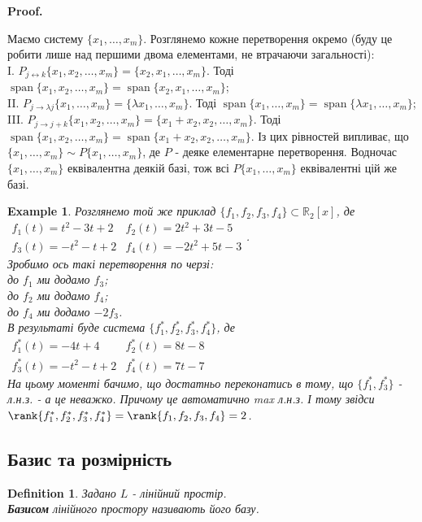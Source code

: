 \documentclass[a4paper, 10pt]{article}
\makeatletter
\theoremstyle{theoremdd}
\newtheorem{definition}[theorem]{Definition}
\newtheorem{example}[theorem]{Example}
\DeclareMathOperator{\linspan}{span}
\renewenvironment{proof}[1][Proof.\\]{\par
\pushQED{\hfill \qed}%
\normalfont \topsep6\p@\@plus6\p@\relax
\trivlist
\item\relax
{\bfseries
#1\@addpunct{.}}\hspace\labelsep\ignorespaces
}{%
\popQED\endtrivlist\@endpefalse
}
\makeatother
\begin{document}
	\begin{proof}
	Маємо систему $\{x_1,\dots,x_m\}$. Розглянемо кожне перетворення окремо (буду це робити лише над першими двома елементами, не втрачаючи загальності):\\
	I. $P_{j \leftrightarrow k} \{x_1,x_2,\dots,x_m\} = \{x_2,x_1,\dots,x_m\}$. Тоді $\linspan\{x_1,x_2,\dots,x_m\} = \linspan\{x_2,x_1,\dots,x_m\}$;\\
	II. $P_{j \to \lambda j} \{x_1,\dots,x_m\} = \{\lambda x_1,\dots,x_m \}$. Тоді $\linspan\{x_1,\dots,x_m\} = \linspan\{\lambda x_1,\dots,x_m\}$;\\
	III. $P_{j \to j+k} \{x_1,x_2,\dots,x_m\} = \{x_1+x_2,x_2,\dots,x_m\}$. Тоді $\linspan\{x_1,x_2,\dots,x_m\} = \linspan\{x_1+x_2,x_2,\dots,x_m\}$.
	Із цих рівностей випливає, що $\{x_1,\dots,x_m\} \sim P\{x_1,\dots,x_m\}$, де $P$ - деяке елементарне перетворення. Водночас $\{x_1,\dots,x_m\}$ еквівалентна деякій базі, тож всі $P\{x_1,\dots,x_m\}$ еквівалентні цій же базі.
	\end{proof}
	
	\begin{example}
	Розглянемо той же приклад $\{f_1,f_2,f_3,f_4\} \subset \mathbb{R}_2[x]$, де\\
	$\begin{matrix}
	f_1(t) = t^2-3t+2 & f_2(t) = 2t^2+3t-5 \\
	f_3(t) = -t^2-t+2 & f_4(t) = -2t^2+5t-3
	\end{matrix}
	$.\\
	Зробимо ось такі перетворення по черзі:\\
	до $f_1$ ми додамо $f_3$;\\
	до $f_2$ ми додамо $f_4$;\\
	до $f_4$ ми додамо $-2f_3$.\\
	В результаті буде система $\{f_1^*,f_2^*,f_3^*,f_4^*\}$, де\\
	$\begin{matrix}
	f_1^*(t) = -4t+4 & f_2^*(t) = 8t-8 \\
	f_3^*(t) = -t^2-t+2 & f_4^*(t) = 7t-7
	\end{matrix}
	$\\
	На цьому моменті бачимо, що достатньо переконатись в тому, що $\{f_1^*,f_3^*\}$ - л.н.з. - а це неважко. Причому це автоматично max л.н.з. І тому звідси $\rank\{f_1^*,f_2^*,f_3^*,f_4^*\} = \rank\{f_1,f_2,f_3,f_4\} = 2$.
	\end{example}
	
	\subsection{Базис та розмірність}
	\begin{definition}
	Задано $L$ - лінійний простір.\\
	\textbf{Базисом} лінійного простору називають його базу.
	\end{definition}
	
\end{document}

